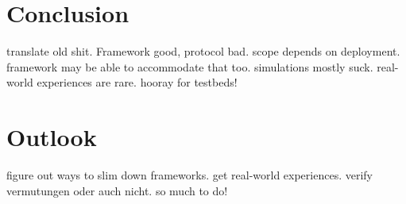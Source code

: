 \documentclass[a4paper,10pt]{scrartcl}
\begin{document}
\section{Conclusion}
\label{sec:conclusion}
translate old shit. Framework good, protocol bad. scope depends on deployment. framework may be able to accommodate that too. simulations mostly suck. real-world experiences are rare. hooray for testbeds!

\section{Outlook}
\label{sec:outlook}
figure out ways to slim down frameworks.
get real-world experiences. verify vermutungen oder auch nicht. so much to do!

\printglossaries

{\small


}
\end{document}
